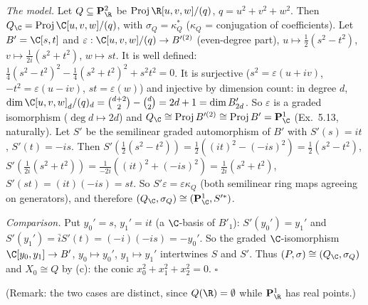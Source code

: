 \documentclass[11pt]{article}
\begin{document}
\emph{The model.} Let $Q\subseteq\mathbf P^2_{\R}$ be $\operatorname{Proj}\R[u,v,w]/(q)$, $q=u^2+v^2+w^2$. Then $Q_{\C}=\operatorname{Proj}\C[u,v,w]/(q)$, with $\sigma_Q=\kappa_Q^*$ ($\kappa_Q$ = conjugation of coefficients). Let $B'=\C[s,t]$ and $\varepsilon:\C[u,v,w]/(q)\to B'^{(2)}$ (even-degree part), $u\mapsto\tfrac12(s^2-t^2)$, $v\mapsto\tfrac1{2i}(s^2+t^2)$, $w\mapsto st$. It is well defined: $\tfrac14(s^2-t^2)^2-\tfrac14(s^2+t^2)^2+s^2t^2=0$. It is surjective ($s^2=\varepsilon(u+iv)$, $-t^2=\varepsilon(u-iv)$, $st=\varepsilon(w)$) and injective by dimension count: in degree $d$, $\dim\C[u,v,w]_d/(q)_d=\binom{d+2}2-\binom d2=2d+1=\dim B'_{2d}$. So $\varepsilon$ is a graded isomorphism ($\deg d\mapsto2d$) and $Q_{\C}\cong\operatorname{Proj}B'^{(2)}\cong\operatorname{Proj}B'=\mathbf P^1_{\C}$ (Ex.~5.13, naturally). Let $S'$ be the semilinear graded automorphism of $B'$ with $S'(s)=it$, $S'(t)=-is$. Then $S'(\tfrac12(s^2-t^2))=\tfrac12((it)^2-(-is)^2)=\tfrac12(s^2-t^2)$, $S'(\tfrac1{2i}(s^2+t^2))=\tfrac1{-2i}((it)^2+(-is)^2)=\tfrac1{2i}(s^2+t^2)$, $S'(st)=(it)(-is)=st$. So $S'\varepsilon=\varepsilon\kappa_Q$ (both semilinear ring maps agreeing on generators), and therefore $(Q_{\C},\sigma_Q)\cong(\mathbf P^1_{\C},S'^*)$.

\emph{Comparison.} Put $y_0'=s$, $y_1'=it$ (a $\C$-basis of $B'_1$): $S'(y_0')=y_1'$ and $S'(y_1')=\bar i S'(t)=(-i)(-is)=-y_0'$. So the graded $\C$-isomorphism $\C[y_0,y_1]\to B'$, $y_0\mapsto y_0'$, $y_1\mapsto y_1'$ intertwines $S$ and $S'$. Thus $(P,\sigma)\cong(Q_{\C},\sigma_Q)$ and $X_0\cong Q$ by (c): the conic $x_0^2+x_1^2+x_2^2=0$. \hfill$\square$

(Remark: the two cases are distinct, since $Q(\R)=\emptyset$ while $\mathbf P^1_{\R}$ has real points.)
\end{document}

